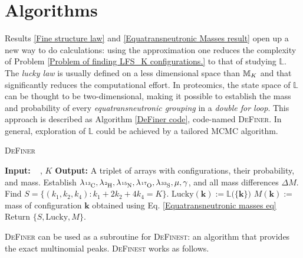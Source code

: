 \section{Algorithms}

Results \ref{Fine structure law} and \ref{Equatransneutronic Masses result} open up a new way to do calculations: using the approximation one reduces the complexity of Problem \ref{Problem of finding LFS_K configurations.} to that of studying $\mathbb{L}$. The {\it lucky law} is usually defined on a less dimensional space than $\mathbb{M}_K$ and that significantly reduces the  computational effort. In proteomics, the state space of $\mathbb{L}$ can be thought to be two-dimensional, making it possible to establish the mass and probability of every {\it equatransneutronic grouping} in a {\it double for loop}. This approach is described as Algorithm \ref{DeFiner code}, code-named \textsc{DeFiner}. In general, exploration of $\mathbb{L}$ could be achieved by a tailored MCMC algorithm.   

\begin{algorithm}\caption{\textsc{DeFiner}}\label{DeFiner code}
\begin{algorithmic}\label{DeFiner Parallely}
	\State	\textbf{Input:}\,\,\,\,\, \molecule, $K$
	\State 	\textbf{Output:} A triplet of arrays with configurations, their probability, and mass.
	\State 	Establish $\lambda_\cem{^{13}C}, \lambda_\cem{^{2} H}, \lambda_\cem{^{15}N}, \lambda_\cem{^{17}O}, \lambda_\cem{^{33}S}, \mu, \gamma $, and all mass differences $\Delta M$.
	\State 	Find   $S = \{ (k_1, k_2, k_4) : k_1 + 2 k_2 + 4 k_4 = K \}$.
		\State 	$\mathrm{Lucky}(\bm{k}) := \mathbb{L}\Big( \{ \bm{k} \} \Big)$
		\State 	$M(\bm{k}) :=$ mass of configuration $\bm{k}$ obtained using Eq. \eqref{Equatransneutronic masses eq} 
	\ENDFORALL
	\State 	Return $\{ S, \mathrm{Lucky}, M\}$.
\end{algorithmic}	
\end{algorithm}

\textsc{DeFiner} can be used as a subroutine for \textsc{DeFinest}: an algorithm that provides the exact multinomial peaks. \textsc{DeFinest} works as follows. 

